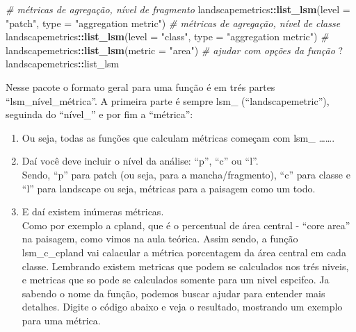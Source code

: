 \documentclass[
]{article}
\newenvironment{Shaded}{\begin{snugshade}}{\end{snugshade}}
\newcommand{\AttributeTok}[1]{\textcolor[rgb]{0.13,0.29,0.53}{#1}}
\newcommand{\CommentTok}[1]{\textcolor[rgb]{0.56,0.35,0.01}{\textit{#1}}}
\newcommand{\FunctionTok}[1]{\textcolor[rgb]{0.13,0.29,0.53}{\textbf{#1}}}
\newcommand{\NormalTok}[1]{#1}
\newcommand{\SpecialCharTok}[1]{\textcolor[rgb]{0.81,0.36,0.00}{\textbf{#1}}}
\newcommand{\StringTok}[1]{\textcolor[rgb]{0.31,0.60,0.02}{#1}}
\begin{document}
\begin{Shaded}
\begin{Highlighting}[]
\CommentTok{\# métricas de agregação, nível de fragmento}
\NormalTok{landscapemetrics}\SpecialCharTok{::}\FunctionTok{list\_lsm}\NormalTok{(}\AttributeTok{level =} \StringTok{"patch"}\NormalTok{, }\AttributeTok{type =} \StringTok{"aggregation metric"}\NormalTok{)}
\CommentTok{\# métricas de agregação, nível de classe}
\NormalTok{landscapemetrics}\SpecialCharTok{::}\FunctionTok{list\_lsm}\NormalTok{(}\AttributeTok{level =} \StringTok{"class"}\NormalTok{, }\AttributeTok{type =} \StringTok{"aggregation metric"}\NormalTok{)}
\CommentTok{\# }
\NormalTok{landscapemetrics}\SpecialCharTok{::}\FunctionTok{list\_lsm}\NormalTok{(}\AttributeTok{metric =} \StringTok{"area"}\NormalTok{)}
\CommentTok{\# ajudar com opções da função}
\NormalTok{?landscapemetrics}\SpecialCharTok{::}\NormalTok{list\_lsm}
\end{Highlighting}
\end{Shaded}

Nesse pacote o formato geral para uma função é em trés partes ``lsm\_nível\_métrica''. A primeira parte é sempre lsm\_ (``landscapemetric''), seguinda do ``nível\_'' e por fim a ``métrica'':

\begin{enumerate}
\def\labelenumi{\arabic{enumi}.}
\item
  Ou seja, todas as funções que calculam métricas começam com lsm\_ \ldots\ldots.
\item
  Daí você deve incluir o nível da análise: ``p'', ``c'' ou ``l''.\\
  Sendo, ``p'' para patch (ou seja, para a mancha/fragmento), ``c'' para classe e ``l'' para landscape ou seja, métricas para a paisagem como um todo.
\item
  E daí existem inúmeras métricas.\\
  Como por exemplo a \colorbox[HTML]{dedede}{cpland}, que é o percentual de área central - ``core area'' na paisagem, como vimos na aula teórica. Assim sendo, a função \colorbox[HTML]{dedede}{lsm\_c\_cpland} vai calacular a métrica porcentagem da área central em cada classe. Lembrando existem metricas que podem se calculados nos trés niveis, e metricas que so pode se calculados somente para um nivel espcifco.
  Ja sabendo o nome da função, podemos buscar ajudar para entender mais detalhes.
  Digite o código abaixo e veja o resultado, mostrando um exemplo para uma métrica.
\end{enumerate}
\end{document}
